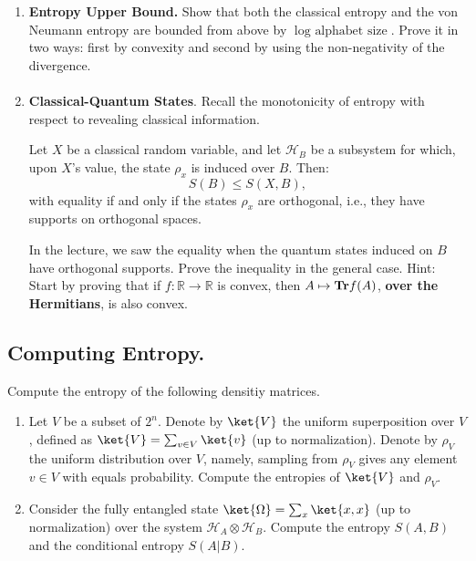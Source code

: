 \documentclass[12pt,a4paper]{article}
\begin{document}
\begin{enumerate}



  \item \textbf{Entropy Upper Bound.}
    Show that both the classical entropy and the von Neumann entropy are bounded from above by $\log \text{ alphabet size}$. Prove it in two ways: first by convexity and second by using the non-negativity of the divergence.

    \paragraph{ }

  \item \textbf{Classical-Quantum States}. Recall the monotonicity of entropy with respect to revealing classical information.
     \begin{claim}
Let $X$ be a classical random variable, and let $\mathcal{H}_B$ be a subsystem for which, upon $X$'s value, the state $\rho_{x}$ is induced over $B$. Then: 
       \[ S(B) \leq S(X,B), \]    
    with equality if and only if the states $\rho_x$ are orthogonal, i.e., they have supports on orthogonal spaces.\end{claim}
    In the lecture, we saw the equality when the quantum states induced on $B$ have orthogonal supports. Prove the inequality in the general case. Hint: Start by proving that if $f : \mathbb{R} \rightarrow \mathbb{R}$ is convex, then $A \mapsto \mathbf{Tr} f(A)$, \textbf{over the Hermitians}, is also convex.

\end{enumerate}

    

\subsection{Computing Entropy.}
Compute the entropy of the following densitiy matrices. 
\begin{enumerate}

  \item Let $V$ be a subset of $2^{n}$. Denote by $\ket{V}$ the uniform superposition over $V$, defined as $\ket{V} = \sum_{v \in V}{\ket{v}}$ (up to normalization). Denote by $\rho_{V}$ the uniform distribution over $V$, namely, sampling from $\rho_{V}$ gives any element $v \in V$ with equals probability. Compute the entropies of $\ket{V}$ and $\rho_{V}$.
    

  \item  Consider the fully entangled state $\ket{\Omega} = \sum_{x}{\ket{x,x}}$ (up to normalization) over the system $\mathcal{H}_{A} \otimes \mathcal{H}_{B}$. Compute the entropy $S(A,B)$ and the conditional entropy $S(A|B)$.
  
  

\end{enumerate}
\end{document}
